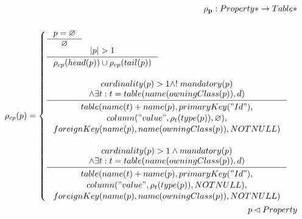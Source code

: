 \documentclass[11pt]{article}
\begin{document}
\begin{align*}
	\mathbf{\rho_p} : Property* \rightarrow Table* \\ \\
	\rho_{cp}(p) = \begin{cases}
		\inference{p = \varnothing}{\varnothing}\\
		\inference{|p| > 1}{\rho_{cp}(head(p)) \cup \rho_{cp}(tail(p))}\\\\
     	\inference{cardinality(p) > 1 \wedge !\;mandatory(p) \\ 
     		\wedge 	\exists t : t = table(name(owningClass(p)), d)
     		}{\begin{gathered}
     			table(name(t)+name(p), primaryKey("Id"), \\ column("value", \rho_t(type(p)), \varnothing), \\ foreignKey(name(p), 			name(owningClass(p)), NOTNULL) \\
    	\end{gathered}}\\ \\
     	\inference{ cardinality(p) > 1 \wedge mandatory(p) \\ 
     		\wedge \exists t : t = table(name(owningClass(p)), d) 
     		}{\begin{gathered}  
     			table(name(t)+name(p), primaryKey("Id"), \\ 
     			column("value", \rho_t(type(p)), NOTNULL), \\ 			foreignKey(name(p), name(owningClass(p)), NOTNULL)
    	 \end{gathered}}
 	\end{cases}\\
 	p \lhd Property
\end{align*}
\end{document}
